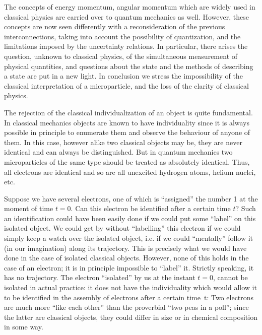 \documentclass[a4paper,sfsidenotes,colorlinks=true]{tufte-book}
\numberwithin{equation}{section}
\numberwithin{figure}{section}
\begin{document}
The concepts of energy momentum, angular momentum which are widely
used in classical physics are carried over to quantum mechanics as
well. However, these concepts are now seen differently with a
reconsideration of the previous interconnections, taking into account
the possibility of quantization, and the limitations imposed by the
uncertainty relations. In particular, there arises the question,
unknown to classical physics, of the simultaneous measurement of
physical quantities, and questions about the state and the methods of
describing a state are put in a new light. In conclusion we stress the
impossibility of the classical interpretation of a microparticle, and
the loss of the clarity of classical physics.


The rejection  of the classical
individualization of an object is quite fundamental. In classical
mechanics objects are known to have individuality since it is always
possible in principle to enumerate them and observe the behaviour of
anyone of them. In this case, however alike two classical objects
may be, they are never identical and can always be distinguished. But
in quantum mechanics two microparticles of the same type should be
treated as absolutely identical. Thus, all electrons are identical and
so are all unexcited hydrogen atoms, helium nuclei, etc.

\begin{fullwidth}
  \setlength{\leftskip}{3cm} \textsf{\small Suppose we have several
    electrons, one of which is ``assigned'' the number 1 at the moment
    of time $t= 0$. Can this electron be identified after a certain
    time $t$? Such an identification could have been easily done if we
    could put some ``label'' on this isolated object. We could get by
    without ``labelling'' this electron if we could simply keep a
    watch over the isolated object, i.e. if we could ``mentally''
    follow it (in our imagination) along its trajectory. This is
    precisely what we would have done in the case of isolated
    classical objects. However, none of this holds in the case of an
    electron; it is in principle impossible to ``label'' it. Strictly
    speaking, it has no trajectory. The electron ``isolated'' by us at
    the instant $t = 0$, cannot be isolated in actual practice: it
    does not have the individuality which would allow it to be
    identified in the assembly of electrons after a certain time~t:
    Two electrons are much more ``like each other'' than the
    proverbial ``two peas in a poll''; since the latter are classical
    objects, they could differ in size or in chemical composition in
    some way.}

\end{fullwidth}
\vspace{5pt}
\setlength{\leftskip}{0pt}
\end{document}
